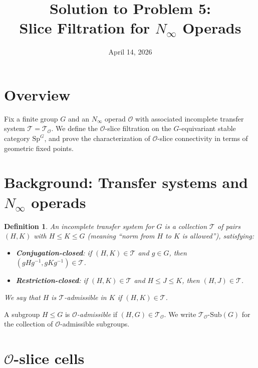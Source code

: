 \documentclass[12pt]{article}
\title{Solution to Problem 5:\\Slice Filtration for $N_\infty$ Operads}
\author{}
\date{April 14, 2026}
\newtheorem{definition}[theorem]{Definition}
\newcommand{\cO}{\mathcal{O}}
\begin{document}
\maketitle

\section*{Overview}

Fix a finite group $G$ and an $N_\infty$ operad $\cO$ with associated incomplete transfer system $\mathcal{T} = \mathcal{T}_\cO$.  We define the $\cO$-slice filtration on the $G$-equivariant stable category $\mathrm{Sp}^G$, and prove the characterization of $\cO$-slice connectivity in terms of geometric fixed points.

\section*{Background: Transfer systems and $N_\infty$ operads}

\begin{definition}
  An \emph{incomplete transfer system} for $G$ is a collection $\mathcal{T}$ of pairs $(H,K)$ with $H \leq K \leq G$ (meaning ``norm from $H$ to $K$ is allowed''), satisfying:
  \begin{itemize}
    \item \textbf{Conjugation-closed}: if $(H,K)\in\mathcal{T}$ and $g\in G$, then $(gHg^{-1}, gKg^{-1})\in\mathcal{T}$.
    \item \textbf{Restriction-closed}: if $(H,K)\in\mathcal{T}$ and $H \leq J \leq K$, then $(H,J)\in\mathcal{T}$.
  \end{itemize}
  We say that $H$ is \emph{$\mathcal{T}$-admissible} in $K$ if $(H,K)\in\mathcal{T}$.
\end{definition}

A subgroup $H \leq G$ is \emph{$\cO$-admissible} if $(H,G)\in\mathcal{T}_\cO$.  We write $\mathcal{T}_\cO$-$\mathrm{Sub}(G)$ for the collection of $\cO$-admissible subgroups.

\section*{$\mathcal{O}$-slice cells}
\end{document}
